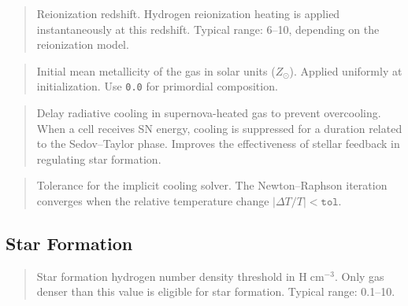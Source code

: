 \label{param:z_reion}

\begin{quote}
Reionization redshift.  Hydrogen reionization heating is applied
instantaneously at this redshift.  Typical range: 6--10, depending
on the reionization model.
\end{quote}

\label{param:z_ave}

\begin{quote}
Initial mean metallicity of the gas in solar units ($Z_\odot$).
Applied uniformly at initialization.  Use \texttt{0.0} for
primordial composition.
\end{quote}

\label{param:delayed_cooling}

\begin{quote}
Delay radiative cooling in supernova-heated gas to prevent
overcooling.  When a cell receives SN energy, cooling is suppressed
for a duration related to the Sedov--Taylor phase.  Improves the
effectiveness of stellar feedback in regulating star formation.
\end{quote}

\label{param:tol}

\begin{quote}
Tolerance for the implicit cooling solver.  The Newton--Raphson
iteration converges when the relative temperature change
$|\Delta T / T| < \texttt{tol}$.
\end{quote}

\subsection{Star Formation}

\label{param:n_star}

\begin{quote}
Star formation hydrogen number density threshold in
$\text{H}\;\text{cm}^{-3}$.  Only gas denser than this value is
eligible for star formation.  Typical range: 0.1--10.
\end{quote}

